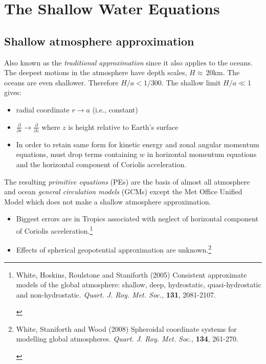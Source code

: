 \documentclass[11pt,fleqn]{book} %
\newcommand{\BTi}{ \begin{tiny}}
\newcommand{\ETi}{ \end{tiny}}
\newcommand{\partd}[2]{\frac{\partial #1}{\partial #2}}
\begin{document}
	
	\newpage
	
	
	
	\chapter{The Shallow Water Equations}
	
	
	\vspace{1em}
	
\section{Shallow atmosphere approximation} 
	
	 Also known as the {\em traditional approximation} since it also
	applies to the oceans. The deepest motions in the atmosphere have
	depth scales, $H\approx\,$20km. The oceans are even shallower. Therefore
	$H/a< 1/300$. The shallow limit $H/a\ll 1$ gives:
	
	\begin{itemize}
		\item
		radial coordinate $r\rightarrow a$ (i.e., constant)
		
		\item
		$\partd{}{r}\rightarrow \partd{}{z}$ where $z$ is height relative to Earth's surface
		
		\item
		In order to retain same form for kinetic energy and zonal angular
		momentum equations, must drop terms containing $w$ in horizontal
		momentum equations and the horizontal component of Coriolis
		acceleration.
	\end{itemize}
	
	The resulting {\em primitive equations} (PEs) are the basis of almost
	all atmosphere and ocean {\em general circulation models} (GCMs)
	except the Met Office Unified Model which does not make a shallow
	atmosphere approximation.
	
	\begin{itemize}
		\item
		Biggest errors are in Tropics associated with neglect of horizontal
		component of Coriolis acceleration.\footnote{\BTi White, Hoskins, Roulstone and Staniforth (2005) Consistent approximate models of the global atmosphere: shallow, deep, hydrostatic, quasi-hydrostatic and non-hydrostatic. \emph{Quart. J. Roy. Met. Soc.}, \textbf{131},
			2081-2107.
			\ETi }
		
		\item
		Effects of spherical geopotential approximation are unknown.\footnote{\BTi White, Staniforth and Wood (2008) Spheroidal coordinate systems for modelling global atmospheres. \emph{Quart. J. Roy. Met. Soc.}, \textbf{134},
			261-270.
			\ETi }
	\end{itemize}
	
\end{document}
